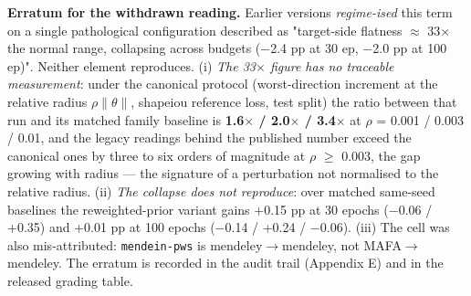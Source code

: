 \documentclass[pdflatex,sn-mathphys-ay]{sn-jnl}
\begin{document}
\textbf{Erratum for the withdrawn reading.} Earlier versions \emph{regime-ised} this term on a single pathological configuration described as "target-side flatness \ensuremath{\approx} 33\ensuremath{\times} the normal range, collapsing across budgets (\ensuremath{-}2.4 pp at 30 ep, \ensuremath{-}2.0 pp at 100 ep)". Neither element reproduces. (i) \emph{The 33\ensuremath{\times} figure has no traceable measurement}: under the canonical protocol (worst-direction increment at the relative radius $\rho\|\theta\|$, shapeiou reference loss, test split) the ratio between that run and its matched family baseline is \textbf{1.6\ensuremath{\times} / 2.0\ensuremath{\times} / 3.4\ensuremath{\times}} at \ensuremath{\rho} = 0.001 / 0.003 / 0.01, and the legacy readings behind the published number exceed the canonical ones by three to six orders of magnitude at \ensuremath{\rho} \ensuremath{\geq} 0.003, the gap growing with radius --- the signature of a perturbation not normalised to the relative radius. (ii) \emph{The collapse does not reproduce}: over matched same-seed baselines the reweighted-prior variant gains +0.15 pp at 30 epochs (\ensuremath{-}0.06 / +0.35) and +0.01 pp at 100 epochs (\ensuremath{-}0.14 / +0.24 / \ensuremath{-}0.06). (iii) The cell was also mis-attributed: \texttt{mendein-pws} is mendeley\ensuremath{\rightarrow}mendeley, not MAFA\ensuremath{\rightarrow}mendeley. The erratum is recorded in the audit trail (Appendix E) and in the released grading table.
\end{document}
